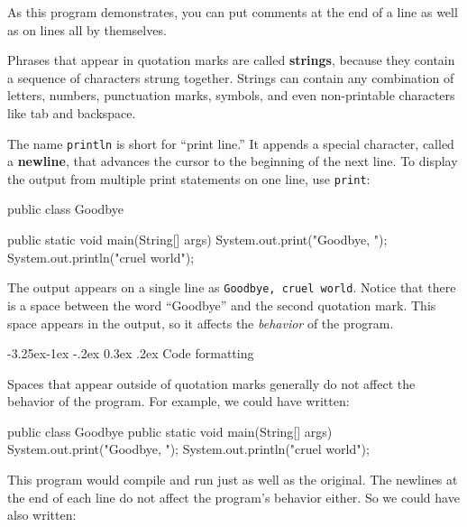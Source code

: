 \documentclass[12pt]{book}
\makeatletter
\renewcommand\subsection{\@startsection{subsection}{2}{\z@}%
    {-3.25ex\@plus -1ex \@minus -.2ex}%
    {0.3ex \@plus .2ex}%
    {\normalfont\large\bfseries}}
\theoremstyle{exercise}
\newcommand{\java}[1]{\lstinline{#1}} %
\makeatother
\begin{document}
As this program demonstrates, you can put comments at the end of a line as well as on lines all by themselves.


Phrases that appear in quotation marks are called {\bf strings}, because they contain a sequence of characters strung together.
Strings can contain any combination of letters, numbers, punctuation marks, symbols, and even non-printable characters like tab and backspace.


The name \java{println} is short for ``print line.''
It appends a special character, called a {\bf newline}, that advances the cursor to the beginning of the next line.
To display the output from multiple print statements on one line, use \java{print}:

\begin{code}
public class Goodbye {

    public static void main(String[] args) {
        System.out.print("Goodbye, ");
        System.out.println("cruel world");
    }

}
\end{code}

The output appears on a single line as {\tt Goodbye, cruel world}.
Notice that there is a space between the word ``Goodbye'' and the second quotation mark.
This space appears in the output, so it affects the {\em behavior} of the program.

\subsection{Code formatting}
\label{sec:formatting}

Spaces that appear outside of quotation marks generally do not affect the behavior of the program.
For example, we could have written:

\begin{code}
public class Goodbye {
public static void main(String[] args) {
System.out.print("Goodbye, ");
System.out.println("cruel world");
}
}
\end{code}

This program would compile and run just as well as the original.
The newlines at the end of each line do not affect the program's behavior either.
So we could have also written:
\end{document}
